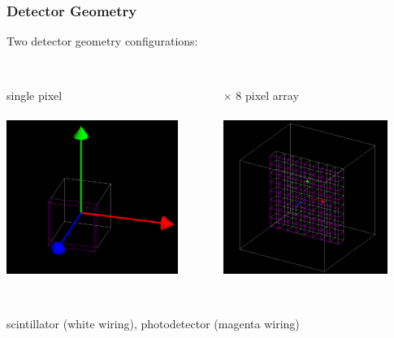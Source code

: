 \documentclass[xcolor=x11names, compress, handout]{beamer}
\renewcommand{\(}{\begin{columns}}
\renewcommand{\)}{\end{columns}}
\newcommand{\<}[1]{\begin{column}{#1}}
\renewcommand{\>}{\end{column}}
\begin{document}
\begin{frame}
\frametitle{Detector Geometry}
Two detector geometry configurations: \\
\
\begin{columns}
\begin{column}{0.49\textwidth}
\centering
single pixel \\
\ \\
\includegraphics[width=\textwidth, height=5cm]{images/singlepixel.png}
\end{column}
\begin{column}{0.49\textwidth}
 $\times$ 8 pixel array \\
\ \\
\includegraphics[width=\textwidth, height=5cm]{images/pixelarray.png}
\end{column}
\end{columns}
\ \\
\centering
scintillator (white wiring), photodetector (magenta wiring)
\end{frame}
\end{document}
